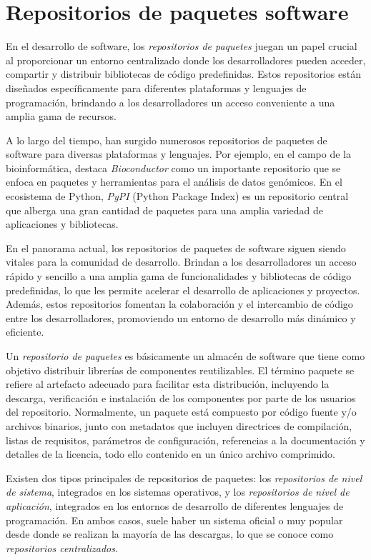 
\section{Repositorios de paquetes software}

En el desarrollo de software, los \textit{repositorios de paquetes} juegan un papel crucial al
proporcionar un entorno centralizado donde los desarrolladores pueden acceder, compartir y distribuir
bibliotecas de código predefinidas. Estos repositorios están diseñados específicamente para diferentes
plataformas y lenguajes de programación, brindando a los desarrolladores un acceso conveniente a una
amplia gama de recursos.

A lo largo del tiempo, han surgido numerosos repositorios de paquetes de software para diversas
plataformas y lenguajes. Por ejemplo, en el campo de la bioinformática, destaca \textit{Bioconductor}
como un importante repositorio que se enfoca en paquetes y herramientas para el análisis de datos
genómicos. En el ecosistema de Python, \textit{PyPI} (Python Package Index) es un repositorio central
que alberga una gran cantidad de paquetes para una amplia variedad de aplicaciones y bibliotecas.

En el panorama actual, los repositorios de paquetes de software siguen siendo vitales para la
comunidad de desarrollo. Brindan a los desarrolladores un acceso rápido y sencillo a una amplia
gama de funcionalidades y bibliotecas de código predefinidas, lo que les permite acelerar el desarrollo
de aplicaciones y proyectos. Además, estos repositorios fomentan la colaboración y el intercambio
de código entre los desarrolladores, promoviendo un entorno de desarrollo más dinámico y eficiente.

Un \textit{repositorio de paquetes} es básicamente un almacén de software que tiene como objetivo
distribuir librerías de componentes reutilizables. El término paquete se refiere al artefacto
adecuado para facilitar esta distribución, incluyendo la descarga, verificación e instalación de
los componentes por parte de los usuarios del repositorio. Normalmente, un paquete está compuesto
por código fuente y/o archivos binarios, junto con metadatos que incluyen directrices de compilación,
listas de requisitos, parámetros de configuración, referencias a la documentación y detalles de la
licencia, todo ello contenido en un único archivo comprimido.

Existen dos tipos principales de repositorios de paquetes: los \textit{repositorios de nivel de sistema},
integrados en los sistemas operativos, y los \textit{repositorios de nivel de aplicación}, integrados
en los entornos de desarrollo de diferentes lenguajes de programación. En ambos casos, suele haber un
sistema oficial o muy popular desde donde se realizan la mayoría de las descargas, lo que se conoce
como \textit{repositorios centralizados}.

